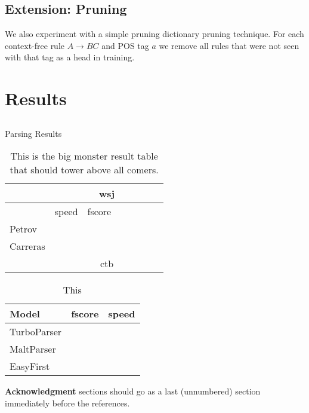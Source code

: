 \documentclass[11pt,letterpaper]{article}
\begin{document}
\subsection{Extension: Pruning}

We also experiment with a simple pruning dictionary pruning technique.
For each context-free rule $A \rightarrow B C$ and POS tag $a$ we
remove all rules that were not seen with that tag as a head in training.



\subsection{}

\section{Results}


\subsection{}


\begin{table*}
  \centering
  Parsing Results


  \begin{tabular}{l|lllllll}
    \hline
    & \multicolumn{7}{|c}{wsj} \\
    \hline
    & speed & fscore \\
    \hline
    Petrov & & & \\
    Carreras & & & \\
    \hline
    \hline
    & \multicolumn{7}{|c}{ctb} \\
    \hline
  \end{tabular}
  \caption{This is the big monster result table that should tower above all comers. }
\end{table*}

\begin{table}
  \centering
  \begin{tabular}{l|ll}
    Model & fscore & speed  \\
    \hline
    TurboParser & & \\
    MaltParser & & \\
    EasyFirst & & \\
  \end{tabular}
  \caption{This }
\end{table}

\textbf{Acknowledgment} sections should go as a last (unnumbered) section immediately
before the references.

% 
% 
\end{document}
